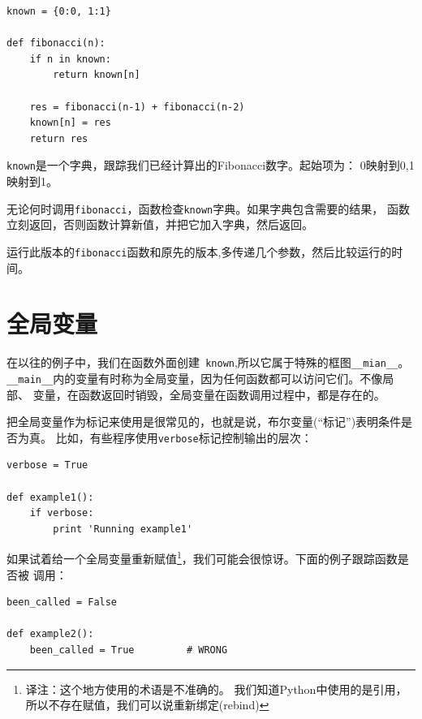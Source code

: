 \beforeverb
\begin{verbatim}
known = {0:0, 1:1}

def fibonacci(n):
    if n in known:
        return known[n]

    res = fibonacci(n-1) + fibonacci(n-2)
    known[n] = res
    return res
\end{verbatim}
\afterverb

{\tt known}是一个字典，跟踪我们已经计算出的Fibonacci数字。起始项为：
0映射到0,1映射到1。

无论何时调用{\tt fibonacci}，函数检查{\tt known}字典。如果字典包含需要的结果，
函数立刻返回，否则函数计算新值，并把它加入字典，然后返回。

\begin{ex}
运行此版本的{\tt fibonacci}函数和原先的版本,多传递几个参数，然后比较运行的时间。
\end{ex}


\section{全局变量}


在以往的例子中，我们在函数外面创建{\tt
	known},所以它属于特殊的框图\verb"__mian__"。
\verb"__main__"内的变量有时称为全局变量，因为任何函数都可以访问它们。不像局部、
变量，在函数返回时销毁，全局变量在函数调用过程中，都是存在的。


把全局变量作为标记来使用是很常见的，也就是说，布尔变量(“标记”)表明条件是否为真。
比如，有些程序使用{\tt verbose}标记控制输出的层次：

\beforeverb
\begin{verbatim}
verbose = True

def example1():
    if verbose:
        print 'Running example1'
\end{verbatim}
\afterverb

如果试着给一个全局变量重新赋值\footnote{译注：这个地方使用的术语是不准确的。
我们知道Python中使用的是引用，所以不存在赋值，我们可以说重新绑定(rebind)}，我们可能会很惊讶。下面的例子跟踪函数是否被
调用：


\beforeverb
\begin{verbatim}
been_called = False

def example2():
    been_called = True         # WRONG
\end{verbatim}
\afterverb

